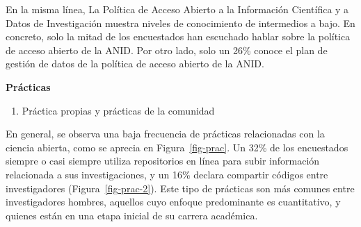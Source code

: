 \documentclass[
  letterpaper,
  DIV=11,
  numbers=noendperiod]{scrreprt}
\providecommand{\tightlist}{%
  \setlength{\itemsep}{0pt}\setlength{\parskip}{0pt}}\usepackage{longtable,booktabs,array}
\begin{document}
En la misma línea, La Política de Acceso Abierto a la Información
Científica y a Datos de Investigación muestra niveles de conocimiento de
intermedios a bajo. En concreto, solo la mitad de los encuestados han
escuchado hablar sobre la política de acceso abierto de la ANID. Por
otro lado, solo un 26\% conoce el plan de gestión de datos de la
política de acceso abierto de la ANID.

\textbf{Prácticas}

\begin{enumerate}
\def\labelenumi{\alph{enumi})}
\tightlist
\item
  Práctica propias y prácticas de la comunidad
\end{enumerate}

En general, se observa una baja frecuencia de prácticas relacionadas con
la ciencia abierta, como se aprecia en Figura~\ref{fig-prac}. Un 32\% de
los encuestados siempre o casi siempre utiliza repositorios en línea
para subir información relacionada a sus investigaciones, y un 16\%
declara compartir códigos entre investigadores
(Figura~\ref{fig-prac-2}). Este tipo de prácticas son más comunes entre
investigadores hombres, aquellos cuyo enfoque predominante es
cuantitativo, y quienes están en una etapa inicial de su carrera
académica.
\end{document}
